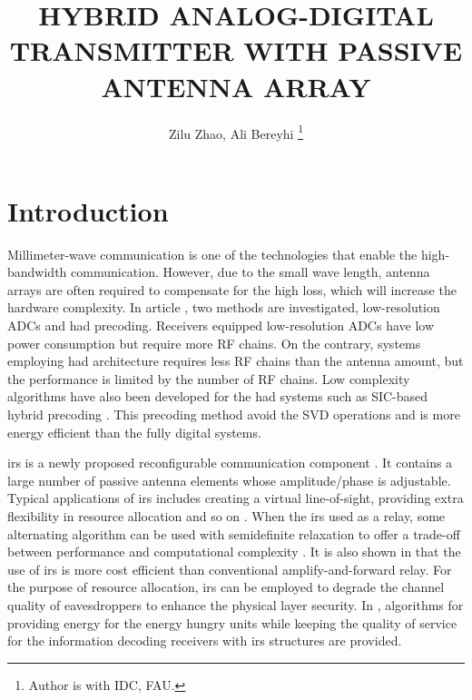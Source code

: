 \documentclass[12pt,draftclsnofoot,onecolumn,journal]{IEEEtran}
\begin{document}
\title{ HYBRID ANALOG-DIGITAL TRANSMITTER WITH PASSIVE ANTENNA ARRAY}

\author{Zilu Zhao, Ali Bereyhi
\thanks{
Author is with IDC, FAU.
}
}

\IEEEoverridecommandlockouts
\maketitle

\section{Introduction}
Millimeter-wave communication is one of the technologies that enable the high-bandwidth communication. However, due to the small wave length, antenna arrays are often required to compensate for the high loss, which will increase the hardware complexity. In article \cite{alkhateeb2014mimo}, two methods are investigated, low-resolution ADCs and \ac{had} precoding. Receivers equipped low-resolution ADCs have low power consumption but require more RF chains. On the contrary, systems employing \ac{had} architecture requires less RF chains than the antenna amount, but the performance is limited by the number of RF chains. Low complexity algorithms have also been developed for the \ac{had} systems such as SIC-based hybrid precoding \cite{gao2016energy}. This precoding method avoid the SVD operations and is more energy efficient than the fully digital systems.

\Ac{irs} is a newly proposed reconfigurable communication component \cite{wu2021intelligent}. It contains a large number of passive antenna elements whose amplitude/phase is adjustable. Typical applications of \ac{irs} includes creating a virtual line-of-sight, providing extra flexibility in resource allocation and so on \cite{wu2019towards}.  When the \ac{irs} used as a relay, some alternating algorithm can be used with semidefinite relaxation to offer a trade-off between performance and computational complexity \cite{wu2019intelligent}. It is also shown in \cite{wu2019intelligent} that the use of \ac{irs} is more cost efficient than conventional amplify-and-forward relay. For the purpose of resource allocation, \ac{irs} can be employed to degrade the channel quality of eavesdroppers \cite{xu2019resource} to enhance the physical layer security. In \cite{xu2022optimal}, algorithms for providing energy for the energy hungry units while keeping the quality of service for the information decoding receivers with \ac{irs} structures are provided.
\end{document}
